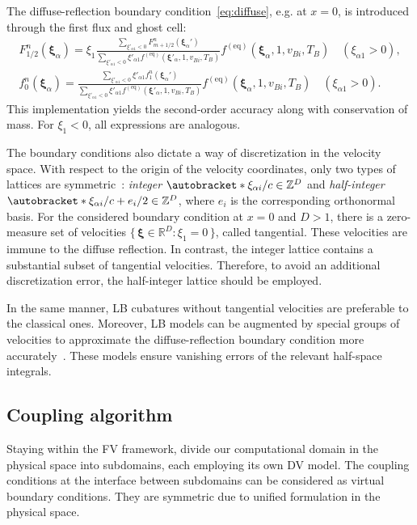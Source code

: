\documentclass{article}
\newcommand{\Set}[2]{\{\,{#1}:{#2}\,\}}
\DeclarePairedDelimiter\autobracket()       %
\newcommand{\br}[1]{\autobracket*{#1}}
\newcommand{\bxi}{{\boldsymbol{\xi}}}
\newcommand{\bxia}{\bxi_\alpha}
\newcommand{\xiai}{\xi_{\alpha i}}
\newcommand{\equil}[1]{#1^\mathrm{(eq)}}
\begin{document}
The diffuse-reflection boundary condition~\eqref{eq:diffuse}, e.g. at \(x=0\),
is introduced through the first flux and ghost cell:
\begin{gather}
    F_{1/2}^n(\bxia) = \displaystyle\xi_1\frac{\sum_{\xi'_{\alpha1}<0}F_{m+1/2}^n(\bxia')}
        {\sum_{\xi'_{\alpha1}<0}\xi'_{\alpha1}\equil{f}(\bxi'_\alpha,1,v_{Bi},T_B)}
        \equil{f}(\bxi_\alpha, 1, v_{Bi}, T_B) \quad (\xi_{\alpha1}>0), \label{eq:first_flux}\\
    f_0^n(\bxia) = \displaystyle\frac{\sum_{\xi'_{\alpha1}<0}\xi'_{\alpha1}f_1^n(\bxia')}
        {\sum_{\xi'_{\alpha1}<0}\xi'_{\alpha1}\equil{f}(\bxi'_\alpha,1,v_{Bi},T_B)}
        \equil{f}(\bxi_\alpha, 1, v_{Bi}, T_B) \quad (\xi_{\alpha1}>0). \label{eq:first_ghost}
\end{gather}
This implementation yields the second-order accuracy along with conservation of mass.
For \(\xi_1<0\), all expressions are analogous.

The boundary conditions also dictate a way of discretization in the velocity space.
With respect to the origin of the velocity coordinates, only two types of lattices are symmetric~\cite{Inamuro1990}:
\emph{integer} \(\br{\xiai/c} \in \mathbb{Z}^D\) and \emph{half-integer} \(\br{\xiai/c + e_i/2} \in \mathbb{Z}^D\),
where \(e_i\) is the corresponding orthonormal basis.
For the considered boundary condition at \(x=0\) and \(D>1\), there is a zero-measure set of velocities
\(\Set{\bxi\in\mathbb{R}^D}{\xi_1=0}\), called tangential.
These velocities are immune to the diffuse reflection.
In contrast, the integer lattice contains a substantial subset of tangential velocities.
Therefore, to avoid an additional discretization error, the half-integer lattice should be employed.

In the same manner, LB cubatures without tangential velocities are preferable to the classical ones.
Moreover, LB models can be augmented by special groups of velocities to approximate
the diffuse-reflection boundary condition more accurately~\cite{Feuchter2016}.
These models ensure vanishing errors of the relevant half-space integrals.

\subsection{Coupling algorithm}\label{sec:coupling}

Staying within the FV framework, divide our computational domain in the physical space
into subdomains, each employing its own DV model.
The coupling conditions at the interface between subdomains can be considered as virtual boundary conditions.
They are symmetric due to unified formulation in the physical space.
\end{document}
